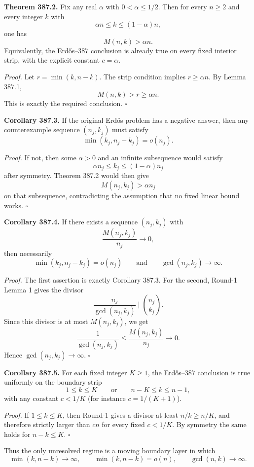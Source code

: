 \textbf{Theorem 387.2.} Fix any real $\alpha$ with $0<\alpha\leq 1/2$. Then for every $n\geq 2$ and every integer $k$ with
\[
\alpha n\leq k\leq (1-\alpha)n,
\]
one has
\[
M(n,k)>\alpha n.
\]
Equivalently, the Erd\H{o}s--387 conclusion is already true on every fixed interior strip, with the explicit constant $c=\alpha$.

\emph{Proof.} Let $r=\min(k,n-k)$. The strip condition implies $r\geq \alpha n$. By Lemma 387.1,
\[
M(n,k)>r\geq \alpha n.
\]
This is exactly the required conclusion. \hfill $\square$

\medskip

\textbf{Corollary 387.3.} If the original Erd\H{o}s problem has a negative answer, then any counterexample sequence $(n_j,k_j)$ must satisfy
\[
\min(k_j,n_j-k_j)=o(n_j).
\]

\emph{Proof.} If not, then some $\alpha>0$ and an infinite subsequence would satisfy
\[
\alpha n_j\leq k_j\leq (1-\alpha)n_j
\]
after symmetry. Theorem 387.2 would then give
\[
M(n_j,k_j)>\alpha n_j
\]
on that subsequence, contradicting the assumption that no fixed linear bound works. \hfill $\square$

\medskip

\textbf{Corollary 387.4.} If there exists a sequence $(n_j,k_j)$ with
\[
\frac{M(n_j,k_j)}{n_j}\to 0,
\]
then necessarily
\[
\min(k_j,n_j-k_j)=o(n_j)
\qquad\text{and}\qquad
\gcd(n_j,k_j)\to\infty.
\]

\emph{Proof.} The first assertion is exactly Corollary 387.3.
For the second, Round-1 Lemma 1 gives the divisor
\[
\frac{n_j}{\gcd(n_j,k_j)}\mid \binom{n_j}{k_j}.
\]
Since this divisor is at most $M(n_j,k_j)$, we get
\[
\frac{1}{\gcd(n_j,k_j)}
\leq
\frac{M(n_j,k_j)}{n_j}
\to 0.
\]
Hence $\gcd(n_j,k_j)\to\infty$. \hfill $\square$

\medskip

\textbf{Corollary 387.5.} For each fixed integer $K\geq 1$, the Erd\H{o}s--387 conclusion is true uniformly on the boundary strip
\[
1\leq k\leq K
\qquad\text{or}\qquad
n-K\leq k\leq n-1,
\]
with any constant $c<1/K$ (for instance $c=1/(K+1)$).

\emph{Proof.} If $1\leq k\leq K$, then Round-1 gives a divisor at least $n/k\geq n/K$, and therefore strictly larger than $cn$ for every fixed $c<1/K$. By symmetry the same holds for $n-k\leq K$. \hfill $\square$

Thus the only unresolved regime is a moving boundary layer in which
\[
\min(k,n-k)\to\infty,
\qquad
\min(k,n-k)=o(n),
\qquad
\gcd(n,k)\to\infty.
\]

